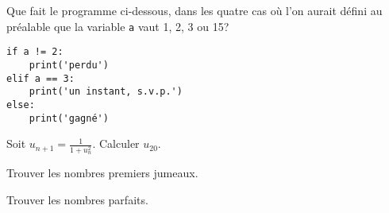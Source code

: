 \begin{question}
Que fait le programme ci-dessous, dans les quatre cas où l'on aurait défini au
préalable que la variable \texttt{a} vaut 1, 2, 3 ou 15?
\begin{verbatim}
if a != 2: 
    print('perdu')
elif a == 3:
    print('un instant, s.v.p.')
else: 
    print('gagné')
\end{verbatim}
\end{question}

\begin{question}
Soit $u_{n+1}= \frac{1}{1+u_n^2}$.
Calculer $u_20$.
\end{question}

\begin{question}
Trouver les nombres premiers jumeaux.
\end{question}

\begin{question}
Trouver les nombres parfaits.
\end{question}
